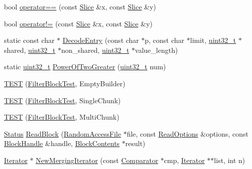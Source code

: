 \begin{DoxyCompactItemize}
\item 
bool \hyperlink{namespaceleveldb_a53c443def2386ea299281cf36de3ae4b}{operator==} (const \hyperlink{classleveldb_1_1_slice}{Slice} \&x, const \hyperlink{classleveldb_1_1_slice}{Slice} \&y)
\item 
bool \hyperlink{namespaceleveldb_a6592a36834e5a52b66cc8357c7ef806b}{operator!=} (const \hyperlink{classleveldb_1_1_slice}{Slice} \&x, const \hyperlink{classleveldb_1_1_slice}{Slice} \&y)
\item 
static const char $\ast$ \hyperlink{namespaceleveldb_a924f4e20853c0748f98e8f93f6a93ab9}{Decode\+Entry} (const char $\ast$p, const char $\ast$limit, \hyperlink{stdint_8h_a435d1572bf3f880d55459d9805097f62}{uint32\+\_\+t} $\ast$shared, \hyperlink{stdint_8h_a435d1572bf3f880d55459d9805097f62}{uint32\+\_\+t} $\ast$non\+\_\+shared, \hyperlink{stdint_8h_a435d1572bf3f880d55459d9805097f62}{uint32\+\_\+t} $\ast$value\+\_\+length)
\item 
static \hyperlink{stdint_8h_a435d1572bf3f880d55459d9805097f62}{uint32\+\_\+t} \hyperlink{namespaceleveldb_ac384682ded94a5919a7a08ccde683654}{Power\+Of\+Two\+Greater} (\hyperlink{stdint_8h_a435d1572bf3f880d55459d9805097f62}{uint32\+\_\+t} num)
\item 
\hyperlink{namespaceleveldb_a8360ab2a7a18ca54cbb3e99d80440248}{T\+E\+S\+T} (\hyperlink{classleveldb_1_1_filter_block_test}{Filter\+Block\+Test}, Empty\+Builder)
\item 
\hyperlink{namespaceleveldb_a9eb56f9aedd874d7e877b5b0e3737854}{T\+E\+S\+T} (\hyperlink{classleveldb_1_1_filter_block_test}{Filter\+Block\+Test}, Single\+Chunk)
\item 
\hyperlink{namespaceleveldb_aa7a90a751773a0c3e22a0fe0c1b67c14}{T\+E\+S\+T} (\hyperlink{classleveldb_1_1_filter_block_test}{Filter\+Block\+Test}, Multi\+Chunk)
\item 
\hyperlink{classleveldb_1_1_status}{Status} \hyperlink{namespaceleveldb_a63198fc7656081fd62695dade629790b}{Read\+Block} (\hyperlink{classleveldb_1_1_random_access_file}{Random\+Access\+File} $\ast$file, const \hyperlink{structleveldb_1_1_read_options}{Read\+Options} \&options, const \hyperlink{classleveldb_1_1_block_handle}{Block\+Handle} \&handle, \hyperlink{structleveldb_1_1_block_contents}{Block\+Contents} $\ast$result)
\item 
\hyperlink{classleveldb_1_1_iterator}{Iterator} $\ast$ \hyperlink{namespaceleveldb_ab8bdbd2babe772234f8dee1bc4f44eb5}{New\+Merging\+Iterator} (const \hyperlink{structleveldb_1_1_comparator}{Comparator} $\ast$cmp, \hyperlink{classleveldb_1_1_iterator}{Iterator} $\ast$$\ast$list, int n)
$$
\end{DoxyCompactItemize}
